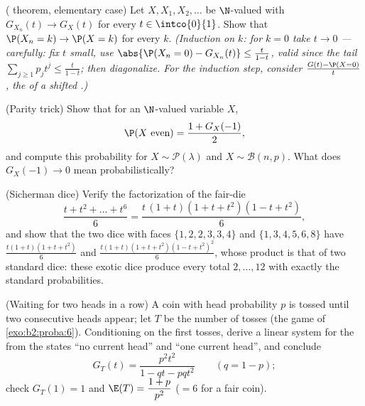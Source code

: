 \begin{exercise}[$\star\star\star$]\label{exo:b2:genfun:9}
( theorem, elementary case) Let $X, X_1, X_2, \dots$ be
$\N$-valued with $G_{X_n}(t) \to G_X(t)$ for every $t \in
\intco{0}{1}$. Show that $\P(X_n = k) \to \P(X = k)$ for every
$k$. \emph{(Induction on $k$: for $k = 0$ take $t \to 0$ ---
carefully: fix $t$ small, use $\abs{\P(X_n = 0) - G_{X_n}(t)}
\leq \frac{t}{1-t}$, valid since the tail $\sum_{j \geq 1}p_jt^j
\leq \frac{t}{1 - t}$; then diagonalize. For the induction step,
consider $\frac{G(t) - \P(X = 0)}{t}$, the  of
a shifted .)}
\end{exercise}

\begin{exercise}[$\star$]\label{exo:b2:genfun:10}
(Parity trick) Show that for an $\N$-valued variable $X$,
\[
\P(X \text{ even}) = \frac{1 + G_X(-1)}{2} ,
\]
and compute this probability for $X \sim \mathcal P(\lambda)$
and $X \sim \mathcal B(n, p)$. What does $G_X(-1) \to 0$ mean
probabilistically?
\end{exercise}

\begin{exercise}[$\star\star$]\label{exo:b2:genfun:11}
(Sicherman dice) Verify the factorization of the fair-die
\[
\frac{t + t^2 + \dots + t^6}{6}
= \frac{t\,(1 + t)(1 + t + t^2)(1 - t + t^2)}{6},
\]
and show that the two dice with faces $\{1, 2, 2, 3, 3, 4\}$
and $\{1, 3, 4, 5, 6, 8\}$ have 
$\frac{t(1+t)(1+t+t^2)}6$ and
$\frac{t(1+t)(1+t+t^2)(1-t+t^2)^2}6$, whose product is that of
two standard dice: these exotic dice produce every total $2,
\dots, 12$ with exactly the standard probabilities.
\end{exercise}

\begin{exercise}[$\star\star\star$]\label{exo:b2:genfun:12}
(Waiting for two heads in a row) A coin with head probability
$p$ is tossed until two consecutive heads appear; let $T$ be
the number of tosses (the game of \cref{exo:b2:proba:6}).
Conditioning on the first tosses, derive a linear system for
the  from the states ``no current head''
and ``one current head'', and conclude
\[
G_T(t) = \frac{p^2t^2}{1 - qt - pqt^2}
\qquad (q = 1 - p);
\]
check $G_T(1) = 1$ and $\E(T) = \dfrac{1 + p}{p^2}$ ($= 6$
for a fair coin).
\end{exercise}

